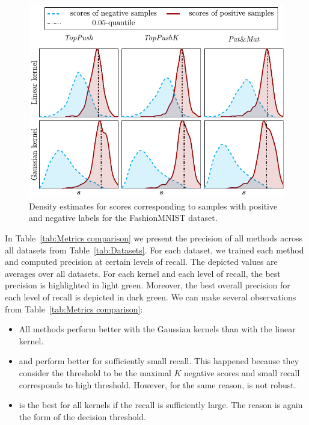 \begin{figure}[!ht]
  \centering
  \includegraphics[width = \linewidth]{images/dual_results2.pdf}
  \caption{Density estimates for scores corresponding to samples with positive and negative labels for the FashionMNIST dataset.}
  \label{fig:Scores comparison}
\end{figure}

In Table~\ref{tab:Metrics comparison} we present the precision of all methods across all datasets from Table~\ref{tab:Datasets}. For each dataset, we trained each method and computed precision at certain levels of recall. The depicted values are averages over all datasets. For each kernel and each level of recall, the best precision is highlighted in light green. Moreover, the best overall precision for each level of recall is depicted in dark green. We can make several observations from Table~\ref{tab:Metrics comparison}:
\begin{itemize}
  \item All methods perform better with the Gaussian kernels than with the linear kernel. 
  \item \TopPush and \TopPushK perform better for sufficiently small recall. This happened because they consider the threshold to be the maximal $K$ negative scores and small recall corresponds to high threshold. However, for the same reason, \TopPush is not robust.
  \item \PatMat is the best for all kernels if the recall is sufficiently large. The reason is again the form of the decision threshold.
\end{itemize}

